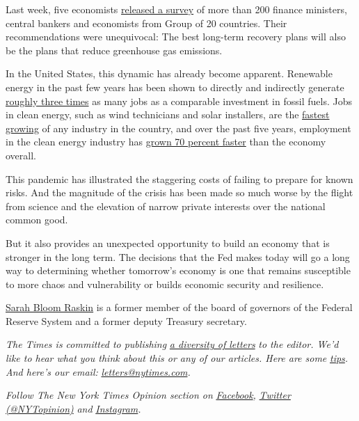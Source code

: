 Last week, five economists
\href{https://www.smithschool.ox.ac.uk/publications/wpapers/workingpaper20-02.pdf}{released
a survey} of more than 200 finance ministers, central bankers and
economists from Group of 20 countries. Their recommendations were
unequivocal: The best long-term recovery plans will also be the plans
that reduce greenhouse gas emissions.

In the United States, this dynamic has already become apparent.
Renewable energy in the past few years has been shown to directly and
indirectly generate
\href{https://www.sciencedirect.com/science/article/abs/pii/S026499931630709X}{roughly
three times} as many jobs as a comparable investment in fossil fuels.
Jobs in clean energy, such as wind technicians and solar installers, are
the \href{https://www.bls.gov/ooh/fastest-growing.htm}{fastest growing}
of any industry in the country, and over the past five years, employment
in the clean energy industry has
\href{https://e2.org/wp-content/uploads/2020/04/E2-Clean-Jobs-America-2020.pdf}{grown
70 percent faster} than the economy overall.

This pandemic has illustrated the staggering costs of failing to prepare
for known risks. And the magnitude of the crisis has been made so much
worse by the flight from science and the elevation of narrow private
interests over the national common good.

But it also provides an unexpected opportunity to build an economy that
is stronger in the long term. The decisions that the Fed makes today
will go a long way to determining whether tomorrow's economy is one that
remains susceptible to more chaos and vulnerability or builds economic
security and resilience.

\href{https://law.duke.edu/fac/raskin/}{Sarah Bloom Raskin} is a former
member of the board of governors of the Federal Reserve System and a
former deputy Treasury secretary.

\emph{The Times is committed to publishing}
\href{https://www.nytimes.com/2019/01/31/opinion/letters/letters-to-editor-new-york-times-women.html}{\emph{a
diversity of letters}} \emph{to the editor. We'd like to hear what you
think about this or any of our articles. Here are some}
\href{https://help.nytimes.com/hc/en-us/articles/115014925288-How-to-submit-a-letter-to-the-editor}{\emph{tips}}\emph{.
And here's our email:}
\href{mailto:letters@nytimes.com}{\emph{letters@nytimes.com}}\emph{.}

\emph{Follow The New York Times Opinion section on}
\href{https://www.facebook.com/nytopinion}{\emph{Facebook}}\emph{,}
\href{http://twitter.com/NYTOpinion}{\emph{Twitter (@NYTopinion)}}
\emph{and}
\href{https://www.instagram.com/nytopinion/}{\emph{Instagram}}\emph{.}

